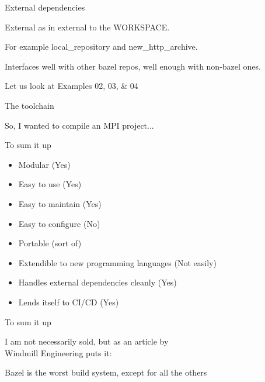 \documentclass[11pt]{beamer}
\begin{document}
\begin{frame}{External dependencies}

  External as in external to the {\ttfamily WORKSPACE}.

  \vspace{5mm}

  For example {\color{bazelGreen}\ttfamily local\_repository} and
  {\color{bazelGreen}\ttfamily new\_http\_archive}.

  \vspace{5mm}

  Interfaces well with other \alert{bazel} repos, well enough with non-\alert{bazel} ones.

  \vspace{5mm}

  Let us look at Examples 02, 03, \& 04

  \BazelNavIcon{}
\end{frame}

\begin{frame}{The toolchain}

  {
    So, I wanted to compile an MPI project...
  }

  \vspace{0.5cm}


  \vspace{0.5cm}


  \BazelNavIcon{}
\end{frame}

\begin{frame}{To sum it up}

  \begin{itemize}
    \item Modular ({\color{bazelGreen}Yes})
    \item Easy to use ({\color{bazelGreen}Yes})
    \item Easy to maintain ({\color{bazelGreen}Yes})
    \item Easy to configure ({\color{mLightBrown}No})
    \item Portable (sort of)
    \item Extendible to new programming languages ({\color{mLightBrown}Not easily})
    \item Handles external dependencies cleanly ({\color{bazelGreen}Yes})
    \item Lends itself to CI/CD ({\color{bazelGreen}Yes})
  \end{itemize}

\end{frame}

\begin{frame}{To sum it up}

  I am not necessarily sold, but as an article by\\
  Windmill Engineering puts it:

  \hfill

  {\large Bazel is the worst build system, except for all the others}

\end{frame}
\end{document}
